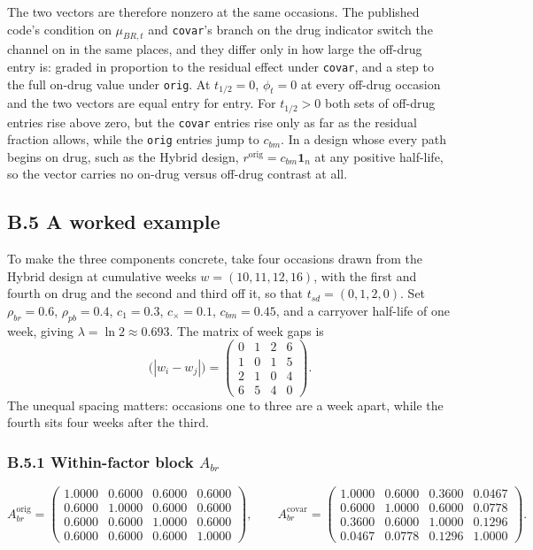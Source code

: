 \documentclass[
  11pt,
]{article}
\begin{document}
The two vectors are therefore nonzero at the same occasions. The
published code's condition on \(\mu_{BR,t}\) and \texttt{covar}'s
branch on the drug indicator switch the channel on in the same places,
and they differ only in how large the off-drug entry is: graded in
proportion to the residual effect under \texttt{covar}, and a step to
the full on-drug value under \texttt{orig}. At \(t_{1/2} = 0\),
\(\phi_t = 0\) at every off-drug occasion and the two vectors are equal
entry for entry. For \(t_{1/2} > 0\) both sets of off-drug entries rise
above zero, but the \texttt{covar} entries rise only as far as the
residual fraction allows, while the \texttt{orig} entries jump to
\(c_{bm}\). In a design whose every path begins on drug, such as the
Hybrid design, \(r^{\text{orig}} = c_{bm}\mathbf{1}_n\) at any positive
half-life, so the vector carries no on-drug versus off-drug contrast
at all.

\subsection{B.5 A worked example}

To make the three components concrete, take four occasions drawn from
the Hybrid design at cumulative weeks
\(w = (10, 11, 12, 16)\), with the first and fourth on drug and the
second and third off it, so that
\(t_{sd} = (0, 1, 2, 0)\). Set \(\rho_{br} = 0.6\), \(\rho_{pb} = 0.4\),
\(c_1 = 0.3\), \(c_{\times} = 0.1\), \(c_{bm} = 0.45\), and a carryover
half-life of one week, giving \(\lambda = \ln 2 \approx 0.693\). The
matrix of week gaps is
\[
\bigl(|w_i - w_j|\bigr) =
\begin{pmatrix}
0 & 1 & 2 & 6\\
1 & 0 & 1 & 5\\
2 & 1 & 0 & 4\\
6 & 5 & 4 & 0
\end{pmatrix}.
\]
The unequal spacing matters: occasions one to three are a week apart,
while the fourth sits four weeks after the third.

\subsubsection{B.5.1 Within-factor block $A_{br}$}

\[
A_{br}^{\text{orig}} =
\begin{pmatrix}
1.0000 & 0.6000 & 0.6000 & 0.6000 \\
0.6000 & 1.0000 & 0.6000 & 0.6000 \\
0.6000 & 0.6000 & 1.0000 & 0.6000 \\
0.6000 & 0.6000 & 0.6000 & 1.0000
\end{pmatrix},
\qquad
A_{br}^{\text{covar}} =
\begin{pmatrix}
1.0000 & 0.6000 & 0.3600 & 0.0467 \\
0.6000 & 1.0000 & 0.6000 & 0.0778 \\
0.3600 & 0.6000 & 1.0000 & 0.1296 \\
0.0467 & 0.0778 & 0.1296 & 1.0000
\end{pmatrix}.
\]
\end{document}
